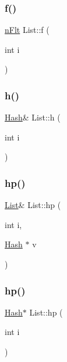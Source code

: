 \mbox{\label{classList_ace52fdc0f6b4f93c0d3762e38d92b645}} 
\subsubsection{\texorpdfstring{f()}{f()}\hspace{0.1cm}{\footnotesize\ttfamily [2/2]}}
{\footnotesize\ttfamily \mbox{\hyperlink{Node_8h_aa7fdace1cf021510d341a4ce92e2223a}{n\+Flt}} List\+::f (\begin{DoxyParamCaption}\item[{int}]{i }\end{DoxyParamCaption})}

\mbox{\label{classList_ade190244d98169e0b56f3d132a849bf8}} 
\subsubsection{\texorpdfstring{h()}{h()}}
{\footnotesize\ttfamily \mbox{\hyperlink{classHash}{Hash}}\& List\+::h (\begin{DoxyParamCaption}\item[{int}]{i }\end{DoxyParamCaption})}

\mbox{\label{classList_a6d02063a1935ee9d4fda5a70e9073dbc}} 
\subsubsection{\texorpdfstring{hp()}{hp()}\hspace{0.1cm}{\footnotesize\ttfamily [1/2]}}
{\footnotesize\ttfamily \mbox{\hyperlink{classList}{List}}\& List\+::hp (\begin{DoxyParamCaption}\item[{int}]{i,  }\item[{\mbox{\hyperlink{classHash}{Hash}} $\ast$}]{v }\end{DoxyParamCaption})}

\mbox{\label{classList_a50879fe523b7543f8d89dbd87911c508}} 
\subsubsection{\texorpdfstring{hp()}{hp()}\hspace{0.1cm}{\footnotesize\ttfamily [2/2]}}
{\footnotesize\ttfamily \mbox{\hyperlink{classHash}{Hash}}$\ast$ List\+::hp (\begin{DoxyParamCaption}\item[{int}]{i }\end{DoxyParamCaption})}

